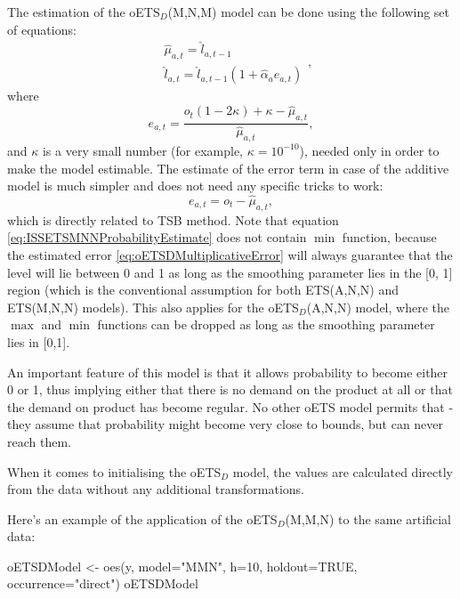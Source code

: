 \documentclass[
]{book}
\newenvironment{Shaded}{\begin{snugshade}}{\end{snugshade}}
\newcommand{\AttributeTok}[1]{\textcolor[rgb]{0.77,0.63,0.00}{#1}}
\newcommand{\ConstantTok}[1]{\textcolor[rgb]{0.00,0.00,0.00}{#1}}
\newcommand{\DecValTok}[1]{\textcolor[rgb]{0.00,0.00,0.81}{#1}}
\newcommand{\FunctionTok}[1]{\textcolor[rgb]{0.00,0.00,0.00}{#1}}
\newcommand{\NormalTok}[1]{#1}
\newcommand{\OtherTok}[1]{\textcolor[rgb]{0.56,0.35,0.01}{#1}}
\newcommand{\StringTok}[1]{\textcolor[rgb]{0.31,0.60,0.02}{#1}}
\theoremstyle{definition}
\theoremstyle{definition}
\theoremstyle{definition}
\theoremstyle{definition}
\theoremstyle{remark}
\begin{document}
The estimation of the oETS\(_D\)(M,N,M) model can be done using the following set of equations:
\begin{equation}
    \begin{aligned}
        & \hat{\mu}_{a,t} = \hat{l}_{a,t-1} \\
        & \hat{l}_{a,t} = \hat{l}_{a,t-1}( 1  + \hat{\alpha}_{a} e_{a,t})
    \end{aligned},
  \label{eq:ISSETSMNNProbabilityEstimate}
\end{equation}
where
\begin{equation}
    e_{a,t} = \frac{o_t (1 - 2 \kappa) + \kappa - \hat{\mu}_{a,t}}{\hat{\mu}_{a,t}},
  \label{eq:oETSDMultiplicativeError}
\end{equation}
and \(\kappa\) is a very small number (for example, \(\kappa = 10^{-10}\)), needed only in order to make the model estimable. The estimate of the error term in case of the additive model is much simpler and does not need any specific tricks to work:
\begin{equation}
    e_{a,t} = o_t - \hat{\mu}_{a,t} ,
  \label{eq:oETSDAdditiveError}
\end{equation}
which is directly related to TSB method. Note that equation \eqref{eq:ISSETSMNNProbabilityEstimate} does not contain \(\min\) function, because the estimated error \eqref{eq:oETSDMultiplicativeError} will always guarantee that the level will lie between 0 and 1 as long as the smoothing parameter lies in the {[}0, 1{]} region (which is the conventional assumption for both ETS(A,N,N) and ETS(M,N,N) models). This also applies for the oETS\(_D\)(A,N,N) model, where the \(\max\) and \(\min\) functions can be dropped as long as the smoothing parameter lies in {[}0,1{]}.

An important feature of this model is that it allows probability to become either 0 or 1, thus implying either that there is no demand on the product at all or that the demand on product has become regular. No other oETS model permits that - they assume that probability might become very close to bounds, but can never reach them.

When it comes to initialising the oETS\(_D\) model, the values are calculated directly from the data without any additional transformations.

Here's an example of the application of the oETS\(_D\)(M,M,N) to the same artificial data:

\begin{Shaded}
\begin{Highlighting}[]
\NormalTok{oETSDModel }\OtherTok{\textless{}{-}} \FunctionTok{oes}\NormalTok{(y, }\AttributeTok{model=}\StringTok{"MMN"}\NormalTok{, }\AttributeTok{h=}\DecValTok{10}\NormalTok{, }\AttributeTok{holdout=}\ConstantTok{TRUE}\NormalTok{,}
                  \AttributeTok{occurrence=}\StringTok{"direct"}\NormalTok{)}
\NormalTok{oETSDModel}
\end{Highlighting}
\end{Shaded}
\end{document}
